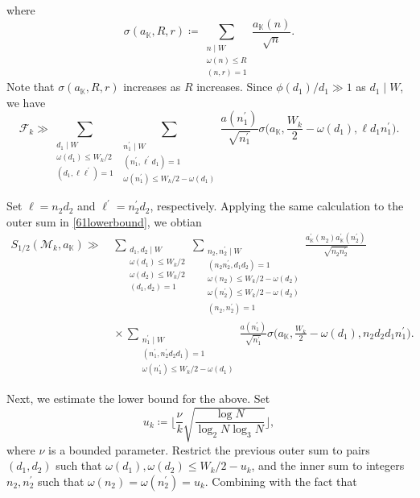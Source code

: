 \documentclass[12pt,reqno]{amsart}
\theoremstyle{definition}
\numberwithin{equation}{section}
\newcommand{\mbk}{\mathbb{K}}
\newcommand{\mcf}{\mathcal{F}}
\newcommand{\mcm}{\mathcal{M}}
\begin{document}
where 
$$
\sigma(a_\mbk, R, r)\coloneqq\sum_{\substack{n \mid W \\
\omega(n) \leq R \\
(n, r)=1}} \frac{a_\mbk(n)}{\sqrt{n}}.
$$
Note that $\sigma(a_\mbk, R, r)$ increases as $R$ increases. Since $\phi(d_1)/d_1 \gg 1$ as $d_1\mid W$, we have
$$
\mcf_k \gg \sum_{\substack{d_1 \mid W \\ \omega(d_1) \leq W_k / 2 \\(d_1, \ell \ell^{\prime})=1}} \sum_{\substack{n_1^{\prime} \mid W \\(n_1^{\prime}, \ell^{\prime} d_1)=1 \\ \omega(n_1^{\prime}) \leq W_k / 2-\omega(d_1)}} \frac{a(n_1^{\prime})}{\sqrt{n_1^{\prime}}} \sigma\Big(a_\mbk, \frac{W_k}{2} -\omega(d_1), \ell d_1 n_1^{\prime}\Big).
$$
\par
Set $\ell=n_2d_2$ and $\ell^\prime=n_2^\prime d_2$, respectively. Applying the same calculation to the outer sum in \eqref{61lowerbound}, we obtian
\begin{align*}
\label{62lowerbound}
   S_{1/2}(\mcm_k,a_\mbk) \gg &\,
   \sum_{\substack{d_1,d_2\mid W \\\omega(d_1)\le W_k/2  \\ \omega(d_2) \le W_k/2 \\(d_1,d_2)=1 }} \sum_{\substack{n_2,n_2^\prime \mid W\\(n_2n_2^\prime,d_1d_2)=1\\\omega(n_2)\le W_k/2-\omega(d_2)\\\omega(n_2^\prime)\le W_k/2-\omega(d_2)\\(n_2,n_2^\prime)=1}}\frac{a_\mbk^\prime(n_2)a_\mbk^\prime(n_2^\prime)}{\sqrt{n_2n_2^\prime}} \\
   &\, \times \sum_{\substack{n_1^{\prime} \mid W \\(n_1^{\prime}, n_2^\prime d_2d_1)=1 \\ \omega(n_1^{\prime}) \leq W_k / 2-\omega(d_1)}} \frac{a(n_1^{\prime})}{\sqrt{n_1^{\prime}}} \sigma\Big(a_\mbk, \frac{W_k}{2} -\omega(d_1),n_2 d_2 d_1 n_1^{\prime}\Big).
\end{align*}
\par
Next, we estimate the lower bound for the above. Set
$$
u_k \coloneqq \bigg\lfloor\frac{\nu}{k}\sqrt{\frac{\log N}{\log_2 N \log_3 N}} \bigg\rfloor,
$$
where $\nu$ is a bounded parameter. Restrict the previous outer sum to pairs $(d_1,d_2)$ such that $\omega(d_1),\omega(d_2)\le W_k/2-u_k$, and the inner sum to integers $n_2,n_2^\prime$ such that $\omega(n_2)=\omega(n_2^\prime)=u_k$. Combining with the fact that
\end{document}
